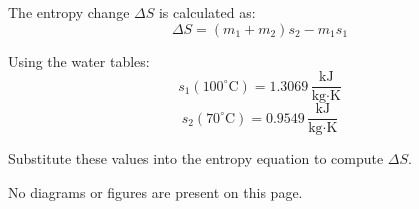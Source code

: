 The entropy change \( \Delta S \) is calculated as:  
\[
\Delta S = (m_1 + m_2) s_2 - m_1 s_1
\]  

Using the water tables:  
\[
s_1(100^\circ\text{C}) = 1.3069 \, \frac{\text{kJ}}{\text{kg·K}}
\]  
\[
s_2(70^\circ\text{C}) = 0.9549 \, \frac{\text{kJ}}{\text{kg·K}}
\]  

Substitute these values into the entropy equation to compute \( \Delta S \).  

No diagrams or figures are present on this page.